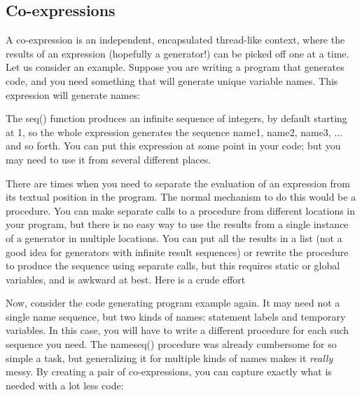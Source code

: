 \subsection{Co-expressions}
A co-expression is an independent, encapsulated
thread{}-like context, where the results of an expression
(hopefully a generator!) can be picked off one at a time. Let us
consider an example. Suppose you are writing a program that generates
code, and you need something that will generate unique variable names.
This expression will generate names:


The \textsf{seq()} function produces an infinite sequence
of integers, by default starting at 1, so the whole expression
generates the sequence \textsf{{\textquotedbl}name1{\textquotedbl}},
\textsf{{\textquotedbl}name2{\textquotedbl}},
\textsf{{\textquotedbl}name3{\textquotedbl}}, ... and so forth. You can
put this expression at some point in your code; but you may need to use
it from several different places.

There are times when you need to separate the evaluation of an
expression from its textual position in the program. The normal
mechanism to do this would be a procedure. You can make separate calls
to a procedure from different locations in your program, but there is
no easy way to use the results from a single instance
of a generator in multiple locations. You can put all the results in a
list (not a good idea for generators with infinite result sequences) or
rewrite the procedure to produce the sequence using separate calls, but
this requires static or global variables, and is awkward at best. Here
is a crude effort


Now, consider the code generating program example again. It may need not
a single name sequence, but two kinds of names: statement labels and
temporary variables. In this case, you will have to write a different
procedure for each such sequence you need. The \textsf{nameseq()}
procedure was already cumbersome for so simple a task, but generalizing
it for multiple kinds of names makes it \textit{really} messy. By
creating a pair of co-expressions, you can capture exactly what is
needed with a lot less code:

